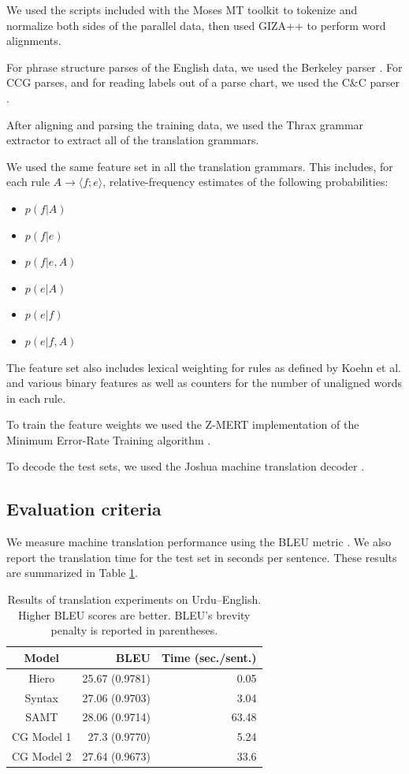 \documentclass[a4paper]{article}
\begin{document}
We used the scripts included with the Moses MT toolkit \cite{moses} to tokenize and normalize both sides of the parallel data, then used GIZA++ \cite{giza} to perform word alignments.

For phrase structure parses of the English data, we used the Berkeley parser \cite{berkeley}. For CCG parses, and for reading labels out of a parse chart, we used the C\&C parser \cite{candc}.

After aligning and parsing the training data, we used the Thrax grammar extractor \cite{joshua3} to extract all of the translation grammars.

We used the same feature set in all the translation grammars. This includes, for each rule $A \to \langle f ; e \rangle$, relative-frequency estimates of the following probabilities:
\begin{itemize}
\item $p(f|A)$
\item $p(f|e)$
\item $p(f|e,A)$
\item $p(e|A)$
\item $p(e|f)$
\item $p(e|f,A)$
\end{itemize}
The feature set also includes lexical weighting for rules as defined by Koehn et al.  and various binary features as well as counters for the number of unaligned words in each rule.

To train the feature weights we used the Z-MERT implementation \cite{zmert} of the Minimum Error-Rate Training algorithm \cite{mert}.

To decode the test sets, we used the Joshua machine translation decoder \cite{joshua3}.

\subsection{Evaluation criteria}

We measure machine translation performance using the BLEU metric \cite{papineni-bleu}. We also report the translation time for the test set in seconds per sentence. These results are summarized in Table \ref{table:results}.

\begin{table}
\centering
\begin{tabular}{|c|r|r|}
\hline
Model & BLEU & Time (sec./sent.) \\
\hline
Hiero & 25.67 (0.9781) & 0.05 \\
Syntax & 27.06 (0.9703) & 3.04 \\
SAMT & 28.06 (0.9714) & 63.48 \\
CG Model 1 & 27.3 (0.9770) & 5.24 \\
CG Model 2 & 27.64 (0.9673) & 33.6 \\
\hline
\end{tabular}
\caption{Results of translation experiments on Urdu--English. Higher BLEU scores are better. BLEU's brevity penalty is reported in parentheses.\label{table:results}}
\end{table}
\end{document}
